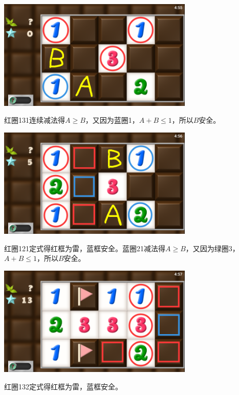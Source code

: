 \subsection{} %
\begin{center}
    \includegraphics[width=0.7\textwidth]{puzzle/74-1.png}
\end{center}
红圈131连续减法得$A\ge B$，又因为蓝圈1，$A+B\le 1$，所以$B$安全。
\begin{center}
    \includegraphics[width=0.7\textwidth]{puzzle/74-2.png}
\end{center}
红圈121定式得红框为雷，蓝框安全。蓝圈21减法得$A\ge B$，又因为绿圈3，$A+B\le 1$，所以$B$安全。
\begin{center}
    \includegraphics[width=0.7\textwidth]{puzzle/74-3.png}
\end{center}
红圈132定式得红框为雷，蓝框安全。

